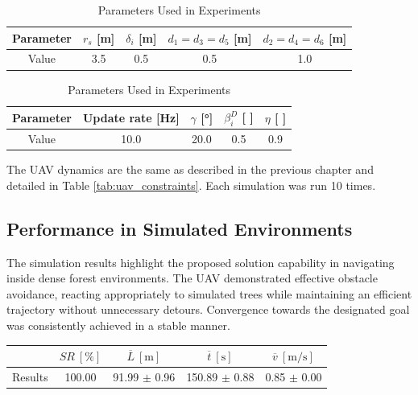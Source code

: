             \begin{table}[H]
                \centering
                \caption{Parameters Used in Experiments}
                
                \begin{tabular}{|c|c|c|c|c|}
                    \hline
                    Parameter & $r_s$ [m]  & $\delta_i$ [m] & $d_1 = d_3 = d_5$ [m] & $d_2 = d_4 = d_6$ [m]   \\ \hline
                    Value & 3.5 & 0.5 & 0.5 & 1.0 \\ \hline
                \end{tabular}
                
                \vspace{0.3cm}
                
                \begin{tabular}{|c|c|c|c|c|}
                    \hline
                    Parameter & Update rate [Hz] & $\gamma$ [°] & $\beta_i^D$ [ ] & $\eta$ [ ] \\ \hline
                    Value & 10.0 & 20.0 & 0.5 & 0.9 \\ \hline
                \end{tabular}
                
                \label{tab:rbl_forest_simulation_parameters}
            \end{table}
            
            The \ac{UAV} dynamics are the same as described in the previous chapter and detailed in Table \ref{tab:uav_constraints}. 
            Each simulation was run 10 times.            

        \subsection{Performance in Simulated Environments}
            The simulation results highlight the proposed solution capability in navigating inside dense forest environments. 
            The \ac{UAV} demonstrated effective obstacle avoidance, reacting appropriately to simulated trees while maintaining an efficient trajectory without unnecessary detours.
            Convergence towards the designated goal was consistently achieved in a stable manner.

            \begin{table}[H]
                \centering
                \renewcommand{\arraystretch}{1.2}
                \begin{tabular}{|c|c|c|c|c|}
                \hline
                                                  & \( SR \ [\%] \) & \( \overline{L} \ [\mathrm{m}] \) & \( \overline{t} \ [\mathrm{s}] \) &  \( \overline{v} \ [\mathrm{m/s}] \)     \\ \hline
                Results                           & 100.00          & 91.99 $\pm$ 0.96                  & 150.89 $\pm$ 0.88                  &  0.85 $\pm$ 0.00                         \\ \hline
                \end{tabular}
            \end{table}

